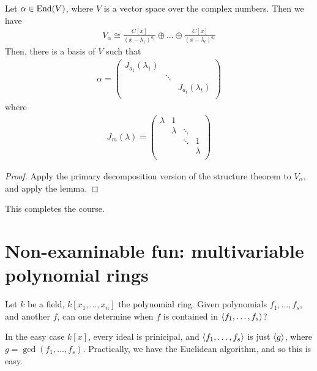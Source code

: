 \documentclass{../../template/note}
\begin{document}
    \begin{theorem}
        Let $\alpha \in \operatorname{End}(V)$, where $V$ is a vector space over the complex numbers. Then we have
        \begin{align*}
            V_\alpha \cong \frac{C[x]}{(x-\lambda_1)^{a_1}} \oplus \dots \oplus \frac{C[x]}{(x-\lambda_t)^{a_t}}
        \end{align*}
        Then, there is a basis of $V$ such that
        \begin{align*}
            \alpha = \begin{pmatrix}
                J_{a_1}(\lambda_1) &  &  \\
                 & \ddots &  \\
                 &  & J_{a_t}(\lambda_t) \\
            \end{pmatrix}
        \end{align*}
        where
        \begin{align*}
            J_m(\lambda) = \begin{pmatrix}
                \lambda & 1 &  &  \\
                 & \lambda & \ddots &  \\
                 &  & \ddots & 1 \\
                 &  &  & \lambda \\
            \end{pmatrix}
        \end{align*}
    \end{theorem}
    
    \begin{proof}
        Apply the primary decomposition version of the structure theorem to $V_\alpha$, and apply the lemma.
    \end{proof}
    
    This completes the course.

    \section{Non-examinable fun: multivariable polynomial rings}

    Let $k$ be a field, $k[x_1, \dots, x_n]$ the polynomial ring. Given polynomials $f_1, \dots, f_s$, and another $f$, can one determine when $f$ is contained in $\left \langle f_1, \dots, f_s \right \rangle$?
    
    In the easy case $k[x]$, every ideal is prinicipal, and $\left \langle f_1, \dots, f_s \right \rangle$ is just $\left \langle g \right \rangle$, where $g = \gcd(f_1, \dots, f_s)$. Practically, we have the Euclidean algorithm, and so this is easy.
\end{document}
